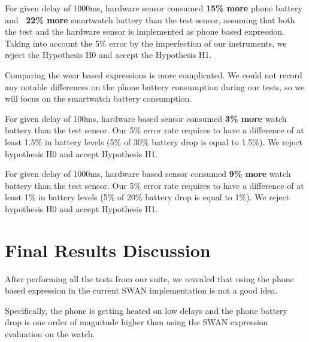 For given delay of 1000ms, hardware sensor consumed \textbf{15\% more} phone battery and \textbf{~22\% more } smartwatch battery than the test sensor, assuming that both the test and the hardware
sensor is implemented as phone based expression.
Taking into account the 5\% error by the imperfection of our instruments, we reject the Hypothesis H0 and accept the Hypothesis H1.

Comparing the wear based expressions is more complicated. We could not record any notable differences on the phone battery consumption during our tests, so we will focus on the smartwatch battery consumption.

For given delay of 100ms,  hardware based sensor consumed \textbf{3\% more} watch battery than the test sensor.
Our 5\% error rate requires to have a difference of at least 1.5\% in battery levels (5\% of 30\% battery drop is equal to 1.5\%). We
reject hypothesis H0 and accept Hypothesis H1.

For given delay of 1000ms,  hardware based sensor consumed \textbf{9\% more} watch battery than the test sensor.
Our 5\% error rate requires to have a difference of at least 1\% in battery levels (5\% of 20\% battery drop is equal to 1\%). We
reject hypothesis H0 and accept Hypothesis H1.

\section{Final Results Discussion}

After performing all the tests from our suite, we revealed that using the phone based expression in the current SWAN implementation is not a good idea.

Specifically, the phone is getting heated on low delays and the phone battery drop is one order of magnitude higher than using the SWAN expression evaluation on the watch.

